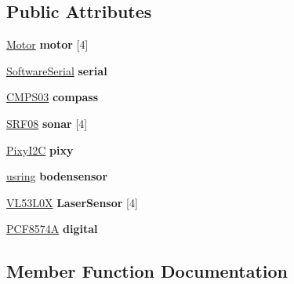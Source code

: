 \subsection*{Public Attributes}
\begin{DoxyCompactItemize}
\item 
\hyperlink{class_motor}{Motor} {\bfseries motor} \mbox{[}4\mbox{]}\hypertarget{class_goldboard4_ad4c496a805d72aa5c9dc89373c365c8d}{}\label{class_goldboard4_ad4c496a805d72aa5c9dc89373c365c8d}

\item 
\hyperlink{class_software_serial}{Software\+Serial} {\bfseries serial}\hypertarget{class_goldboard4_af133e9049fb5f1ade2de5402f209a0d0}{}\label{class_goldboard4_af133e9049fb5f1ade2de5402f209a0d0}

\item 
\hyperlink{class_c_m_p_s03}{C\+M\+P\+S03} {\bfseries compass}\hypertarget{class_goldboard4_abbe4d3f12b7003981f497ee200bfabd0}{}\label{class_goldboard4_abbe4d3f12b7003981f497ee200bfabd0}

\item 
\hyperlink{class_s_r_f08}{S\+R\+F08} {\bfseries sonar} \mbox{[}4\mbox{]}\hypertarget{class_goldboard4_ad33895d9300227e2ed714b6a43ade37f}{}\label{class_goldboard4_ad33895d9300227e2ed714b6a43ade37f}

\item 
\hyperlink{class_t_pixy}{Pixy\+I2C} {\bfseries pixy}\hypertarget{class_goldboard4_ad12ee511eff45283e6920cd8c82c7cc4}{}\label{class_goldboard4_ad12ee511eff45283e6920cd8c82c7cc4}

\item 
\hyperlink{classusring}{usring} {\bfseries bodensensor}\hypertarget{class_goldboard4_a13f2f620c8cdbc211e5651a114ddc912}{}\label{class_goldboard4_a13f2f620c8cdbc211e5651a114ddc912}

\item 
\hyperlink{class_v_l53_l0_x}{V\+L53\+L0X} {\bfseries Laser\+Sensor} \mbox{[}4\mbox{]}\hypertarget{class_goldboard4_a203effa1c5b0637b01c9d0e8685573dd}{}\label{class_goldboard4_a203effa1c5b0637b01c9d0e8685573dd}

\item 
\hyperlink{class_p_c_f8574_a}{P\+C\+F8574A} {\bfseries digital}\hypertarget{class_goldboard4_a01f0aa53885e0c2b59bbf5a424ec7588}{}\label{class_goldboard4_a01f0aa53885e0c2b59bbf5a424ec7588}

\end{DoxyCompactItemize}


\subsection{Member Function Documentation}
